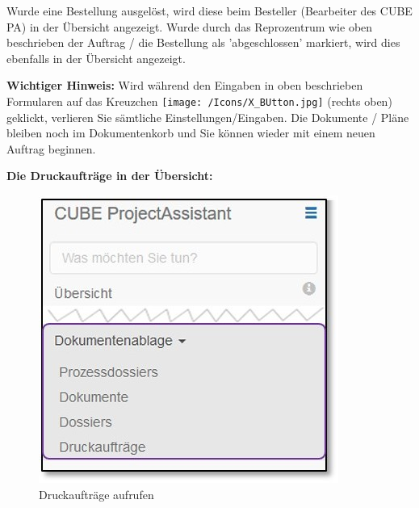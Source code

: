 \vspace{\baselineskip}

Wurde eine Bestellung ausgelöst, wird diese beim Besteller (Bearbeiter des CUBE PA) in der Übersicht angezeigt. Wurde durch das Reprozentrum wie oben beschrieben der Auftrag / die Bestellung als 'abgeschlossen' markiert, wird dies ebenfalls in der Übersicht angezeigt.

\vspace{\baselineskip}

\textbf{Wichtiger Hinweis:} Wird während den Eingaben in oben beschrieben Formularen auf das Kreuzchen \texttt{[image: /Icons/X\_BUtton.jpg]} (rechts oben) geklickt, verlieren Sie sämtliche Einstellungen/Eingaben. Die Dokumente / Pläne bleiben noch im Dokumentenkorb und Sie können wieder mit einem neuen Auftrag beginnen.

\vspace{\baselineskip}

\textbf{Die Druckaufträge in der Übersicht:}\\

\begin{figure}   %
  \vspace{-35pt}      %
  \begin{center}
    \includegraphics[width=1\linewidth]{../chapters/11_Dokumentenablage/pictures/11_Menu_Dokumentenablage_s.jpg}
  \end{center}
  \vspace{-20pt}
  \caption{Druckaufträge aufrufen}
  \vspace{-10pt}
\end{figure}

